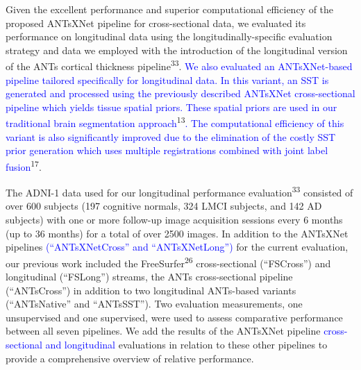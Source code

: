 \documentclass[12pt,]{article}
\begin{document}
Given the excellent performance and superior computational efficiency of
the proposed ANTsXNet pipeline for cross-sectional data, we evaluated
its performance on longitudinal data using the longitudinally-specific
evaluation strategy and data we employed with the introduction of the
longitudinal version of the ANTs cortical thickness
pipeline\textsuperscript{33}. \textcolor{blue}{
We also evaluated an ANTsXNet-based pipeline tailored specifically for longitudinal
data.  In this variant, an SST is generated and processed using the previously
described ANTsXNet cross-sectional pipeline which yields tissue spatial priors.
These spatial priors are used in our traditional brain segmentation approach}\textsuperscript{13}\textcolor{blue}{.  The computational efficiency of this variant is also
significantly improved due to the elimination of the costly SST prior generation
which uses multiple registrations combined with joint label fusion}\textsuperscript{17}.

The ADNI-1 data used for our longitudinal performance
evaluation\textsuperscript{33} consisted of over 600 subjects (197
cognitive normals, 324 LMCI subjects, and 142 AD subjects) with one or
more follow-up image acquisition sessions every 6 months (up to 36
months) for a total of over 2500 images. In addition to the ANTsXNet
pipelines \textcolor{blue}{(``ANTsXNetCross'' and
``ANTsXNetLong'')} for the current evaluation, our previous work
included the FreeSurfer\textsuperscript{26} cross-sectional
(``FSCross'') and longitudinal (``FSLong'') streams, the ANTs
cross-sectional pipeline (``ANTsCross'') in addition to two longitudinal
ANTs-based variants (``ANTsNative'' and ``ANTsSST''). Two evaluation
measurements, one unsupervised and one supervised, were used to assess
comparative performance between all seven pipelines. We add the results
of the ANTsXNet pipeline
\textcolor{blue}{cross-sectional and longitudinal} evaluations in
relation to these other pipelines to provide a comprehensive overview of
relative performance.
\end{document}
